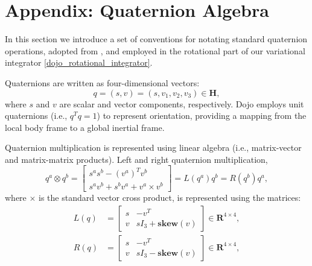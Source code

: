 \section{Appendix: Quaternion Algebra}
\label{dojo_quaternion_algebra}
In this section we introduce a set of conventions for notating standard quaternion operations, adopted from \cite{brudigam2020linear,jackson2021planning}, and employed in the rotational part of our variational integrator \eqref{dojo_rotational_integrator}.

Quaternions are written as four-dimensional vectors:
\begin{equation}
	q = (s, v) = (s, v_1, v_2, v_3) \in \mathbf{H},
\end{equation}
where $s$ and $v$ are scalar and vector components, respectively. Dojo employs unit quaternions (i.e., $q^T q = 1$) to represent orientation, providing a mapping from the local body frame to a global inertial frame.

Quaternion multiplication is represented using linear algebra (i.e., matrix-vector and matrix-matrix products). Left and right quaternion multiplication, 
\begin{equation} 
	q^a \otimes q^b 
	= \begin{bmatrix}
		s^a s^b - (v^a)^T v^b \\
		s^a v^b + s^b v^a + v^a \times v^b
	\end{bmatrix} 
	= L(q^a)q^b = R(q^b) q^a ,
\end{equation}
where $\times$ is the standard vector cross product, is represented using the matrices:
\begin{align}
	L(q) &= \begin{bmatrix}
		s & -v^T \\
		v & s I_3 + \mathbf{skew}(v)
	\end{bmatrix} \in \mathbf{R}^{4 \times 4},\\
	R(q) &= \begin{bmatrix}
		s & -v^T \\
		v & s I_3 - \mathbf{skew}(v)
	\end{bmatrix} \in \mathbf{R}^{4 \times 4},
\end{align}

